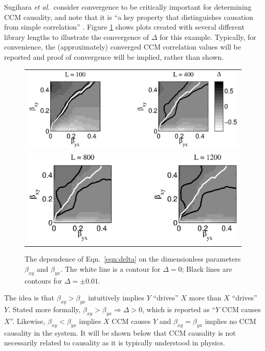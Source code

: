 \documentclass[twocolumn,aps,pre,groupedaddress]{revtex4-1}
\begin{document}
Sugihara {\em et al.\ }consider convergence to be critically important for determining CCM causality, and note that it is ``a key property that distinguishes causation from simple correlation'' \cite{Sugihara2012}.  Figure \ref{fig:BGridPlot} shows plots created with several different library lengths to illustrate the convergence of $\Delta$ for this example.  Typically, for convenience, the (approximately) converged CCM correlation values will be reported and proof of convergence will be implied, rather than shown.
\begin{figure}[ht]
\begin{tabular}{l}
\includegraphics[scale=0.5]{Figure1A.eps}\\
\includegraphics[scale=0.5]{Figure1B.eps}
\end{tabular}
\caption{The dependence of Eqn.\ \ref{eqn:delta} on the dimensionless parameters $\beta_{xy}$ and $\beta_{yx}$.  The white line is a contour for $\Delta=0$; Black lines are contours for $\Delta=\pm 0.01$.}
\label{fig:BGridPlot}
\end{figure}

The idea is that $\beta_{xy}>\beta_{yx}$ intuitively implies $Y$ ``drives'' $X$ more than $X$ ``drives'' $Y$.  Stated more formally, $\beta_{xy}>\beta_{yx}\Rightarrow\Delta>0$, which is reported as ``$Y$ CCM causes $X$''.  Likewise, $\beta_{xy}<\beta_{yx}$ implies $X$ CCM causes $Y$ and $\beta_{xy}=\beta_{yx}$ implies no CCM causality in the system.  It will be shown below that CCM causality is not necessarily related to causality as it is typically understood in physics.
\end{document}
